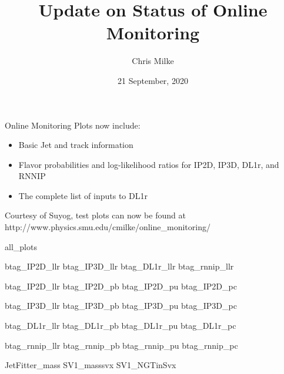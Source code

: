 \documentclass{beamer}
\begin{document}
    \title{Update on Status of Online Monitoring}
    \author{Chris Milke}
    \date{21 September, 2020}

    \frame{\titlepage}

    {
        Online Monitoring Plots now include:
        \begin{itemize}
            \item Basic Jet and track information
            \item Flavor probabilities and log-likelihood ratios for IP2D, IP3D, DL1r, and RNNIP
            \item The complete list of inputs to DL1r
        \end{itemize}

        \vspace{10mm}
        {\tiny Courtesy of Suyog, test plots can now be found at \\ http://www.physics.smu.edu/cmilke/online\_monitoring/}
    }{all_plots}

        {btag_IP2D_llr}
        {btag_IP3D_llr}
        {btag_DL1r_llr}
        {btag_rnnip_llr}

        {btag_IP2D_llr}
        {btag_IP2D_pb}
        {btag_IP2D_pu}
        {btag_IP2D_pc}

        {btag_IP3D_llr}
        {btag_IP3D_pb}
        {btag_IP3D_pu}
        {btag_IP3D_pc}

        {btag_DL1r_llr}
        {btag_DL1r_pb}
        {btag_DL1r_pu}
        {btag_DL1r_pc}

        {btag_rnnip_llr}
        {btag_rnnip_pb}
        {btag_rnnip_pu}
        {btag_rnnip_pc}

        {}
        {JetFitter_mass}
        {SV1_masssvx}
        {SV1_NGTinSvx}
   
\end{document}
